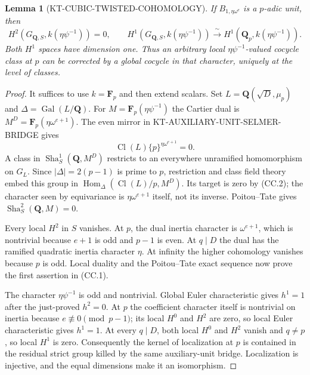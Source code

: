 \documentclass[11pt,a4paper]{article}
\newtheorem{lemma}[theorem]{Lemma}
\theoremstyle{definition}
\newcommand{\Sha}{\operatorname{Sha}}
\begin{document}
\begin{lemma}[KT-CUBIC-TWISTED-COHOMOLOGY]
If $B_{1,\eta\omega^e}$ is a $p$-adic unit, then
\[
 H^2(G_{\mathbf Q,S},k(\eta\psi^{-1}))=0,
 \qquad
 H^1(G_{\mathbf Q,S},k(\eta\psi^{-1}))
   \xrightarrow{\;\sim\;}
 H^1(\mathbf Q_p,k(\eta\psi^{-1})).                \tag{CC.1}
\]
Both $H^1$ spaces have dimension one.  Thus an arbitrary local
$\eta\psi^{-1}$-valued cocycle class at $p$ can be corrected by a
global cocycle in that character, uniquely at the level of classes.
\end{lemma}
\begin{proof}
It suffices to use $k=\mathbf F_p$ and then extend scalars.
Set $L=\mathbf Q(\sqrt D,\mu_p)$ and
$\Delta=\operatorname{Gal}(L/\mathbf Q)$.
For $M=\mathbf F_p(\eta\psi^{-1})$ the Cartier dual is
$M^D=\mathbf F_p(\eta\omega^{e+1})$.
The even mirror in KT-AUXILIARY-UNIT-SELMER-BRIDGE gives
\[
          \operatorname{Cl}(L)\{p\}^{\eta\omega^{e+1}}=0.
                                                               \tag{CC.2}
\]
A class in $\Sha^1_S(\mathbf Q,M^D)$ restricts to an everywhere
unramified homomorphism on $G_L$.  Since $|\Delta|=2(p-1)$ is
prime to $p$, restriction and class field theory embed this group
in $\operatorname{Hom}_\Delta(\operatorname{Cl}(L)/p,M^D)$.
Its target is zero by (CC.2); the character seen by equivariance
is $\eta\omega^{e+1}$ itself, not its inverse.
Poitou--Tate gives $\Sha^2_S(\mathbf Q,M)=0$.

Every local $H^2$ in $S$ vanishes.  At $p$, the dual inertia
character is $\omega^{e+1}$, which is nontrivial because $e+1$
is odd and $p-1$ is even.  At $q\mid D$ the dual has the ramified
quadratic inertia character $\eta$.  At infinity the higher
cohomology vanishes because $p$ is odd.  Local duality and the
Poitou--Tate exact sequence now prove the first assertion in
(CC.1).

The character $\eta\psi^{-1}$ is odd and nontrivial.  Global
Euler characteristic gives $h^1=1$ after the just-proved $h^2=0$.
At $p$ the coefficient character itself is nontrivial on inertia
because $e\not\equiv0\pmod{p-1}$; its local $H^0$ and $H^2$
are zero, so local Euler characteristic gives $h^1=1$.
At every $q\mid D$, both local $H^0$ and $H^2$ vanish and
$q\ne p$, so local $H^1$ is zero.
Consequently the kernel of localization at $p$ is contained in
the residual strict group killed by the same auxiliary-unit
bridge.  Localization is injective, and the equal dimensions
make it an isomorphism.
\end{proof}
\end{document}
